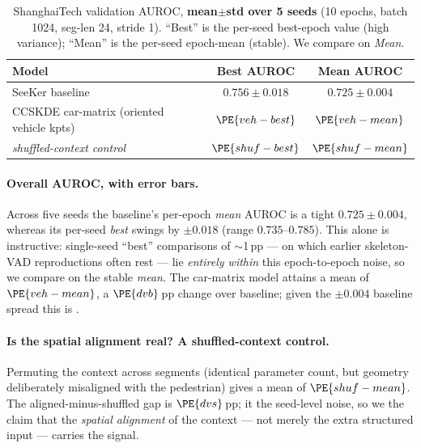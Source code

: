 \begin{table}[h]
\centering
\caption{ShanghaiTech validation AUROC, \textbf{mean$\pm$std over 5 seeds}
(10 epochs, batch 1024, seg-len 24, stride 1). ``Best'' is the per-seed
best-epoch value (high variance); ``Mean'' is the per-seed epoch-mean
(stable). We compare on \emph{Mean}.}
\label{tab:multiseed}
\begin{tabular}{lcc}
\toprule
Model & Best AUROC & Mean AUROC \\
\midrule
SeeKer baseline & $0.756 \pm 0.018$ & $0.725 \pm 0.004$ \\
CCSKDE car-matrix (oriented vehicle kpts) & $\PE{veh-best}$ & $\PE{veh-mean}$ \\
\;\;\emph{shuffled-context control} & $\PE{shuf-best}$ & $\PE{shuf-mean}$ \\
\bottomrule
\end{tabular}
\end{table}

\paragraph{Overall AUROC, with error bars.}
Across five seeds the baseline's per-epoch \emph{mean} AUROC is a tight
$0.725\pm0.004$, whereas its per-seed \emph{best} swings by $\pm0.018$ (range
$0.735$--$0.785$). This alone is instructive: single-seed ``best'' comparisons of
$\sim$1\,pp --- on which earlier skeleton-VAD reproductions often rest --- lie
\emph{entirely within} this epoch-to-epoch noise, so we compare on the stable
\emph{mean}. The car-matrix model attains a mean of $\PE{veh-mean}$, a
$\PE{dvb}$\,pp change over baseline; given the $\pm0.004$ baseline spread this is
.

\paragraph{Is the spatial alignment real? A shuffled-context control.}
Permuting the context across segments (identical parameter count, but
geometry deliberately misaligned with the pedestrian) gives a mean of
$\PE{shuf-mean}$. The aligned-minus-shuffled gap is $\PE{dvs}$\,pp; it
 the seed-level noise, so we  the
claim that the \emph{spatial alignment} of the context --- not merely the extra
structured input --- carries the signal.

